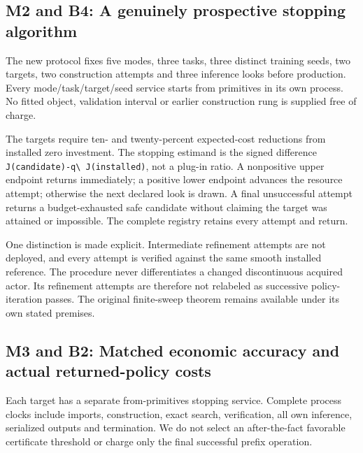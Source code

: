 \documentclass[ecta,nameyear,draft]{econsocart}
\begin{document}
\hypertarget{m2-and-b4-a-genuinely-prospective-stopping-algorithm}{%
\subsection{M2 and B4: A genuinely prospective stopping
algorithm}\label{m2-and-b4-a-genuinely-prospective-stopping-algorithm}}

The new protocol fixes five modes, three tasks, three distinct training
seeds, two targets, two construction attempts and three inference looks
before production. Every mode/task/target/seed service starts from
primitives in its own process. No fitted object, validation interval or
earlier construction rung is supplied free of charge.

The targets require ten- and twenty-percent expected-cost reductions
from installed zero investment. The stopping estimand is the signed
difference \nolinkurl{J(candidate)-q\ J(installed)}, not a plug-in ratio. A
nonpositive upper endpoint returns immediately; a positive lower
endpoint advances the resource attempt; otherwise the next declared look
is drawn. A final unsuccessful attempt returns a budget-exhausted safe
candidate without claiming the target was attained or impossible. The
complete registry retains every attempt and return.

One distinction is made explicit. Intermediate refinement attempts are
not deployed, and every attempt is verified against the same smooth
installed reference. The procedure never differentiates a changed
discontinuous acquired actor. Its refinement attempts are therefore not
relabeled as successive policy-iteration passes. The original
finite-sweep theorem remains available under its own stated premises.

\hypertarget{m3-and-b2-matched-economic-accuracy-and-actual-returned-policy-costs}{%
\subsection{M3 and B2: Matched economic accuracy and actual
returned-policy
costs}\label{m3-and-b2-matched-economic-accuracy-and-actual-returned-policy-costs}}

Each target has a separate from-primitives stopping service. Complete
process clocks include imports, construction, exact search,
verification, all own inference, serialized outputs and termination. We
do not select an after-the-fact favorable certificate threshold or
charge only the final successful prefix operation.
\end{document}
